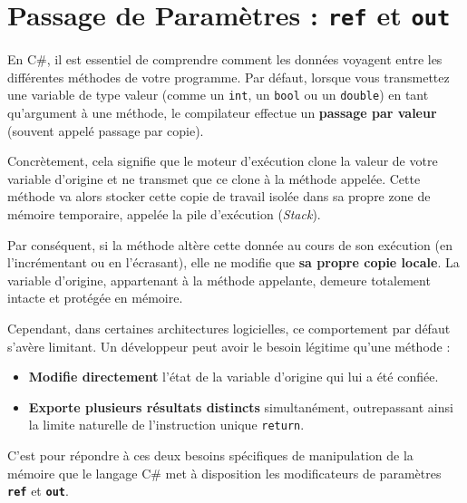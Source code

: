 
\newpage
\section{Passage de Paramètres : \texttt{ref} et \texttt{out}}

En C\#, il est essentiel de comprendre comment les données voyagent entre les différentes méthodes de votre programme. Par défaut, lorsque vous transmettez une variable de type valeur (comme un \texttt{int}, un \texttt{bool} ou un \texttt{double}) en tant qu'argument à une méthode, le compilateur effectue un \textbf{passage par valeur} (souvent appelé passage par copie).

Concrètement, cela signifie que le moteur d'exécution clone la valeur de votre variable d'origine et ne transmet que ce clone à la méthode appelée. Cette méthode va alors stocker cette copie de travail isolée dans sa propre zone de mémoire temporaire, appelée la pile d'exécution (\emph{Stack}). 

Par conséquent, si la méthode altère cette donnée au cours de son exécution (en l'incrémentant ou en l'écrasant), elle ne modifie que \textbf{sa propre copie locale}. La variable d'origine, appartenant à la méthode appelante, demeure totalement intacte et protégée en mémoire.

Cependant, dans certaines architectures logicielles, ce comportement par défaut s'avère limitant. Un développeur peut avoir le besoin légitime qu'une méthode :
\begin{itemize}
    \item \textbf{Modifie directement} l'état de la variable d'origine qui lui a été confiée.
    \item \textbf{Exporte plusieurs résultats distincts} simultanément, outrepassant ainsi la limite naturelle de l'instruction unique \texttt{return}.
\end{itemize}

C'est pour répondre à ces deux besoins spécifiques de manipulation de la mémoire que le langage C\# met à disposition les modificateurs de paramètres \textbf{\texttt{ref}} et \textbf{\texttt{out}}.

